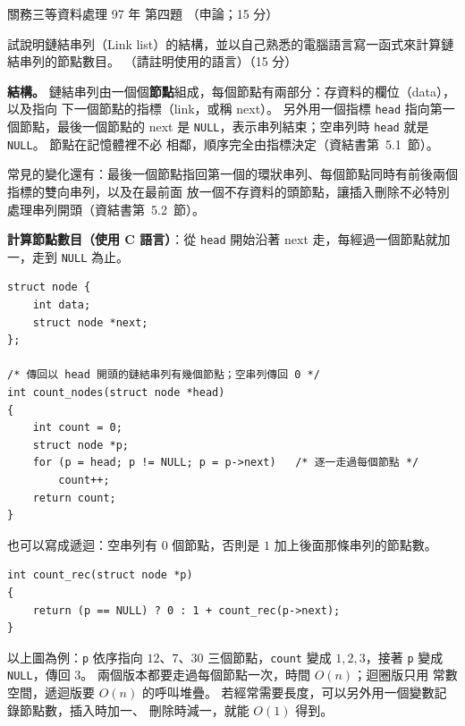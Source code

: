 \begin{pastexam}[label={px:gw3-097-ds-04}]{關務三等資料處理 97 年 第四題}
（申論；15 分）

試說明鏈結串列（Link list）的結構，並以自己熟悉的電腦語言寫一函式來計算鏈結串列的節點數目。
（請註明使用的語言）（15 分）
\end{pastexam}

\begin{pastsoln}
\textbf{結構。} 鏈結串列由一個個\textbf{節點}組成，每個節點有兩部分：存資料的欄位（data），以及指向
下一個節點的指標（link，或稱 next）。 另外用一個指標 \texttt{head} 指向第一個節點，最後一個節點的
next 是 \texttt{NULL}，表示串列結束；空串列時 \texttt{head} 就是 \texttt{NULL}。 節點在記憶體裡不必
相鄰，順序完全由指標決定（資結書第~5.1~節）。
\begin{center}
\end{center}
常見的變化還有：最後一個節點指回第一個的環狀串列、每個節點同時有前後兩個指標的雙向串列，以及在最前面
放一個不存資料的頭節點，讓插入刪除不必特別處理串列開頭（資結書第~5.2~節）。

\textbf{計算節點數目（使用 C 語言）}：從 \texttt{head} 開始沿著 next 走，每經過一個節點就加一，走到
\texttt{NULL} 為止。
\begin{verbatim}
struct node {
    int data;
    struct node *next;
};

/* 傳回以 head 開頭的鏈結串列有幾個節點；空串列傳回 0 */
int count_nodes(struct node *head)
{
    int count = 0;
    struct node *p;
    for (p = head; p != NULL; p = p->next)   /* 逐一走過每個節點 */
        count++;
    return count;
}
\end{verbatim}
也可以寫成遞迴：空串列有 $0$ 個節點，否則是 $1$ 加上後面那條串列的節點數。
\begin{verbatim}
int count_rec(struct node *p)
{
    return (p == NULL) ? 0 : 1 + count_rec(p->next);
}
\end{verbatim}
以上圖為例：\texttt{p} 依序指向 $12$、$7$、$30$ 三個節點，\texttt{count} 變成 $1, 2, 3$，接著
\texttt{p} 變成 \texttt{NULL}，傳回 $3$。 兩個版本都要走過每個節點一次，時間 $O(n)$；迴圈版只用
常數空間，遞迴版要 $O(n)$ 的呼叫堆疊。 若經常需要長度，可以另外用一個變數記錄節點數，插入時加一、
刪除時減一，就能 $O(1)$ 得到。
\end{pastsoln}
